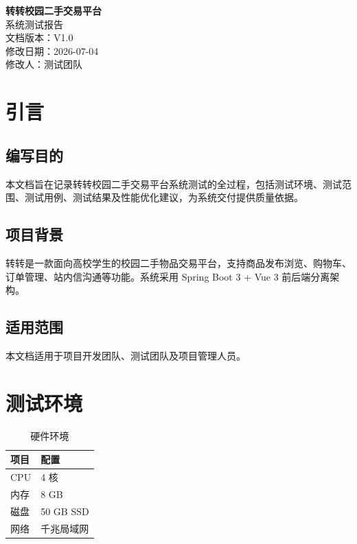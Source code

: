 \documentclass[12pt,a4paper,UTF8]{ctexart}
\begin{document}
\begin{titlepage}
\centering
\vspace*{4cm}
{\Huge\bfseries 转转校园二手交易平台\\[0.5cm]}
{\LARGE 系统测试报告}\\[2cm]
{\large 文档版本：V1.0}\\
{\large 修改日期：2026-07-04}\\
{\large 修改人：测试团队}\\[5cm]
\vfill
\end{titlepage}

\tableofcontents
\newpage

\section{引言}

\subsection{编写目的}
本文档旨在记录转转校园二手交易平台系统测试的全过程，包括测试环境、测试范围、测试用例、测试结果及性能优化建议，为系统交付提供质量依据。

\subsection{项目背景}
转转是一款面向高校学生的校园二手物品交易平台，支持商品发布浏览、购物车、订单管理、站内信沟通等功能。系统采用 Spring Boot 3 + Vue 3 前后端分离架构。

\subsection{适用范围}
本文档适用于项目开发团队、测试团队及项目管理人员。

\section{测试环境}

\begin{table}[H]
\centering
\caption{硬件环境}
\begin{tabularx}{\textwidth}{lX}
\toprule
\textbf{项目} & \textbf{配置} \\
\midrule
CPU & 4 核 \\
内存 & 8 GB \\
磁盘 & 50 GB SSD \\
网络 & 千兆局域网 \\
\bottomrule
\end{tabularx}
\end{table}
\end{document}
